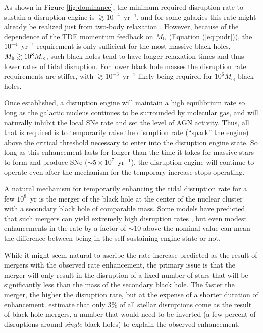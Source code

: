 \documentclass[preprint2]{aastex}
\begin{document}
As shown in Figure \ref{fig:dominance}, the minimum required disruption rate to sustain a disruption engine is $\gtrsim 10^{-4}$~yr$^{-1}$, and for some galaxies this rate might already be realized just from two-body relaxation \citep{Stone:2016a}. However, because of the dependence of the TDE momentum feedback on $M_{\rm h}$ (Equation (\ref{eq:pudr})), the $10^{-4}$~yr$^{-1}$ requirement is only sufficient for the most-massive black holes, $M_{\rm h} \gtrsim 10^{8} M_{\odot}$, such black holes tend to have longer relaxation times and thus lower rates of tidal disruption. For lower black hole masses the disruption rate requirements are stiffer, with $\gtrsim 10^{-3}$~yr$^{-1}$ likely being required for $10^{6} M_{\odot}$ black holes.

Once established, a disruption engine will maintain a high equilibrium rate so long as the galactic nucleus continues to be surrounded by molecular gas, and will naturally inhibit the local SNe rate and set the level of AGN activity. Thus, all that is required is to temporarily raise the disruption rate (``spark'' the engine) above the critical threshold necessary to enter into the disruption engine state. So long as this enhancement lasts for longer than the time it takes for massive stars to form and produce SNe ($\sim 5 \times 10^{7}$~yr$^{-1}$), the disruption engine will continue to operate even after the mechanism for the temporary increase stops operating.

A natural mechanism for temporarily enhancing the tidal disruption rate for a few $10^{8}$~yr is the merger of the black hole at the center of the nuclear cluster with a secondary black hole of comparable mass. Some models have predicted that such mergers can yield extremely high disruption rates \citep{Chen:2009a}, but even modest enhancements in the rate by a factor of $\sim 10$ above the nominal value can mean the difference between being in the self-sustaining engine state or not.

While it might seem natural to ascribe the rate increase predicted as the result of mergers with the observed rate enhancement, the primary issue is that the merger will only result in the disruption of a fixed number of stars that will be significantly less than the mass of the secondary black hole. The faster the merger, the higher the disruption rate, but at the expense of a shorter duration of enhancement. \citet{Wegg:2011a} estimate that only 3\% of all stellar disruptions come as the result of black hole mergers, a number that would need to be inverted (a few percent of disruptions around {\it single} black holes) to explain the observed enhancement.
\end{document}
